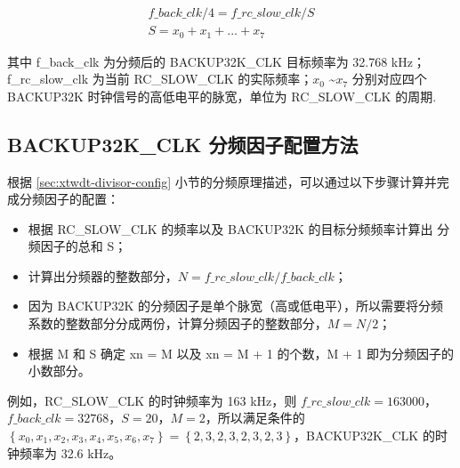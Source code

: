 \documentclass[main\_\_CN.tex]{subfiles}
\begin{document}
\begin{gather*}
f\_back\_clk / 4 = f\_rc\_slow\_clk/S \\
S = x_0 + x_1 + ... + x_7
\end{gather*}

其中 f\_back\_clk 为分频后的 BACKUP32K\_CLK 目标频率为 32.768 kHz；f\_rc\_slow\_clk 为当前 RC\_SLOW\_CLK 的实际频率；\begin{math}x_0\end{math} \textasciitilde \begin{math}x_7\end{math} 分别对应四个 BACKUP32K 时钟信号的高低电平的脉宽，单位为 RC\_SLOW\_CLK 的周期.

\subsection{BACKUP32K\_CLK 分频因子配置方法}

根据 \ref{sec:xtwdt-divisor-config} 小节的分频原理描述，可以通过以下步骤计算并完成分频因子的配置：
\begin{itemize}
    \item 根据 RC\_SLOW\_CLK 的频率以及 BACKUP32K 的目标分频频率计算出 分频因子的总和 S；
    \item 计算出分频器的整数部分，\begin{math}N = f\_rc\_slow\_clk / f\_back\_clk\end{math}；
    \item 因为 BACKUP32K 的分频因子是单个脉宽（高或低电平），所以需要将分频系数的整数部分分成两份，计算分频因子的整数部分，\begin{math}M = N/2\end{math}；
    \item 根据 M 和 S 确定 xn = M 以及 xn = M + 1 的个数，M + 1 即为分频因子的小数部分。
    \end{itemize}

    例如，RC\_SLOW\_CLK 的时钟频率为 163 kHz，则 \begin{math} f\_rc\_slow\_clk = 163000\end{math}，\begin{math}f\_back\_clk = 32768\end{math}，\begin{math}S = 20\end{math}，\begin{math}M = 2\end{math}，所以满足条件的 \begin{math}\left\{x_0, x_1, x_2, x_3, x_4, x_5, x_6, x_7\right\} = \left\{2, 3, 2, 3, 2, 3, 2, 3\right\}\end{math}，BACKUP32K\_CLK 的时钟频率为 32.6 kHz。
\end{document}
